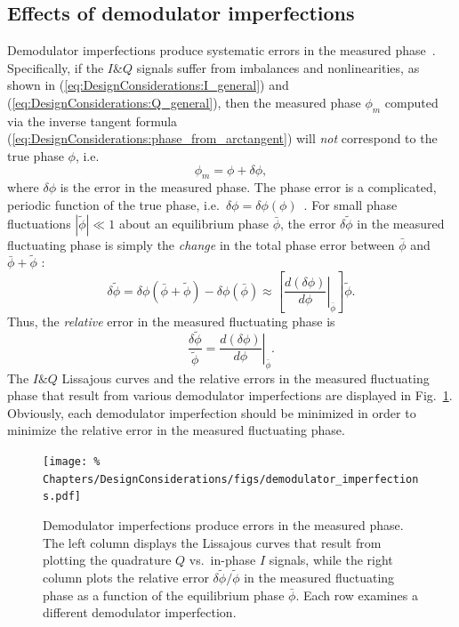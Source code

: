 \subsection{Effects of demodulator imperfections}
\label{sec:DesignConsiderations:demodulation:imperfection_implications}
Demodulator imperfections produce systematic errors
in the measured phase~\cite{vanzeeland_rsi04,kasten_masters}.
Specifically, if the $I\&Q$ signals suffer from imbalances and nonlinearities,
as shown in (\ref{eq:DesignConsiderations:I_general}) and
(\ref{eq:DesignConsiderations:Q_general}),
then the measured phase $\phi_m$ computed via the inverse tangent formula
(\ref{eq:DesignConsiderations:phase_from_arctangent})
will \emph{not} correspond to the true phase $\phi$, i.e.\
\begin{equation}
  \phi_m = \phi + \delta \phi,
\end{equation}
where $\delta\phi$ is the error in the measured phase.
The phase error is a complicated, periodic function of the true phase,
i.e.\ $\delta\phi = \delta\phi(\phi)$~\cite{vanzeeland_rsi04}.
For small phase fluctuations $|\tilde{\phi}| \ll 1$
about an equilibrium phase $\bar{\phi}$,
the error $\delta\tilde{\phi}$ in the measured fluctuating phase
is simply the \emph{change} in the total phase error
between $\bar{\phi}$ and $\bar{\phi} + \tilde{\phi}$
\cite{kasten_masters}:
\begin{equation}
  \delta\tilde{\phi}
  =
  \delta\phi(\bar{\phi} + \tilde{\phi}) - \delta\phi(\bar{\phi})
  \approx
  \left[%
    \left. \frac{d(\delta\phi)}{d\phi} \right|_{\bar{\phi}}
  \right] \tilde{\phi}.
\end{equation}
Thus, the \emph{relative} error in the measured fluctuating phase is
\begin{equation}
  \frac{\delta\tilde{\phi}}{\tilde{\phi}}
  =
  \left. \frac{d(\delta\phi)}{d\phi} \right|_{\bar{\phi}}.
  \label{eq:DesignConsiderations:relative_fluctuation_error}
\end{equation}
The $I\&Q$ Lissajous curves and
the relative errors in the measured fluctuating phase
that result from various demodulator imperfections
are displayed in
Fig.~\ref{fig:DesignConsiderations:effects_of_demodulator_imperfections}.
Obviously, each demodulator imperfection should be minimized
in order to minimize the relative error
in the measured fluctuating phase.

\begin{figure}
  \centering
  \texttt{[image: \%
    Chapters/DesignConsiderations/figs/demodulator\_imperfections.pdf]}
  \caption[Effects of demodulator imperfections]{%
    Demodulator imperfections produce errors in the measured phase.
    The left column displays the Lissajous curves
    that result from plotting
    the quadrature $Q$ vs.\ in-phase $I$ signals, while
    the right column plots the relative error
    $\delta\tilde{\phi} / \tilde{\phi}$
    in the measured fluctuating phase
    as a function of the equilibrium phase $\bar{\phi}$.
    Each row examines a different demodulator imperfection.
  }
  \label{fig:DesignConsiderations:effects_of_demodulator_imperfections}
\end{figure}


